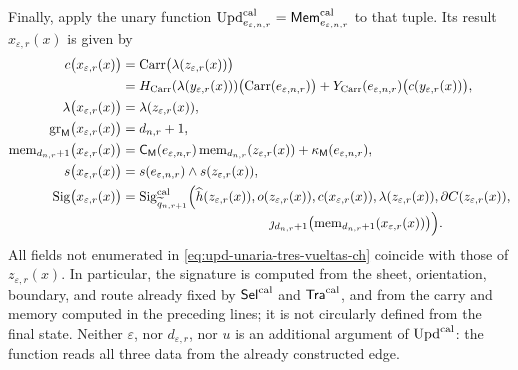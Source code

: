 Finally, apply the unary function
\(\operatorname{Upd}^{\rm cal}_{e_{\varepsilon,n,r}}
=\mathsf{Mem}^{\rm cal}_{e_{\varepsilon,n,r}}\) to that tuple. Its result
\(x_{\varepsilon,r}(x)\) is given by
\begin{equation}
\begin{aligned}
 c\bigl(x_{\varepsilon,r}(x)\bigr)
   &=\operatorname{Carr}\bigl(\lambda(z_{\varepsilon,r}(x))\bigr)\\
   &=H_{\rm Carr}(\lambda(y_{\varepsilon,r}(x)))
       \bigl(\operatorname{Carr}(e_{\varepsilon,n,r})\bigr)
     +Y_{\rm Carr}(e_{\varepsilon,n,r})
       \bigl(c(y_{\varepsilon,r}(x))\bigr),\\
 \lambda\bigl(x_{\varepsilon,r}(x)\bigr)
   &=\lambda(z_{\varepsilon,r}(x)),\\
 \operatorname{gr}_{\mathsf M}
      \bigl(x_{\varepsilon,r}(x)\bigr)
   &=d_{n,r}+1,\\
 \operatorname{mem}_{d_{n,r}+1}
       \bigl(x_{\varepsilon,r}(x)\bigr)
   &=\mathsf C_{\mathsf M}(e_{\varepsilon,n,r})
       \operatorname{mem}_{d_{n,r}}(z_{\varepsilon,r}(x))
     +\kappa_{\mathsf M}(e_{\varepsilon,n,r}),\\
 s\bigl(x_{\varepsilon,r}(x)\bigr)
   &=s(e_{\varepsilon,n,r})\wedge s(z_{\varepsilon,r}(x)),\\
 \operatorname{Sig}\bigl(x_{\varepsilon,r}(x)\bigr)
   &=\operatorname{Sig}^{\rm cal}_{\widetilde q_{n,r+1}}
       \Bigl(\widehat h(z_{\varepsilon,r}(x)),
             o(z_{\varepsilon,r}(x)),
             c(x_{\varepsilon,r}(x)),
             \lambda(z_{\varepsilon,r}(x)),
             \partial C(z_{\varepsilon,r}(x)),\\[-2pt]
   &\hspace{112pt}
             \jmath_{d_{n,r}+1}
              \bigl(\operatorname{mem}_{d_{n,r}+1}
                 (x_{\varepsilon,r}(x))\bigr)\Bigr).
\end{aligned}
\label{eq:upd-unaria-tres-vueltas-ch}
\end{equation}
All fields not enumerated in \eqref{eq:upd-unaria-tres-vueltas-ch} coincide
with those of \(z_{\varepsilon,r}(x)\). In particular, the signature is
computed from the sheet, orientation, boundary, and route already fixed by
\(\mathsf{Sel}^{\rm cal}\) and \(\mathsf{Tra}^{\rm cal}\), and from the carry
and memory computed in the preceding lines; it is not circularly defined from
the final state. Neither \(\varepsilon\), nor \(d_{\varepsilon,r}\), nor
\(u\) is an additional argument of \(\operatorname{Upd}^{\rm cal}\): the
function reads all three data from the already constructed edge.

